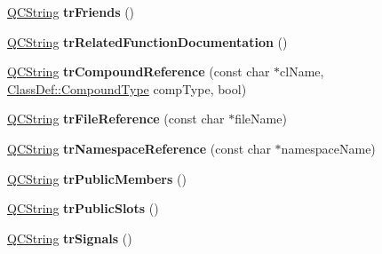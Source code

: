 \begin{DoxyCompactItemize}
\item 
\hypertarget{class_translator_croatian_a09300dedef1bc1ce5c2de5d70e6051bf}{\hyperlink{class_q_c_string}{Q\-C\-String} {\bfseries tr\-Friends} ()}\label{class_translator_croatian_a09300dedef1bc1ce5c2de5d70e6051bf}

\item 
\hypertarget{class_translator_croatian_ae97d87449f2ff86c736e70fdeb6c2534}{\hyperlink{class_q_c_string}{Q\-C\-String} {\bfseries tr\-Related\-Function\-Documentation} ()}\label{class_translator_croatian_ae97d87449f2ff86c736e70fdeb6c2534}

\item 
\hypertarget{class_translator_croatian_ad67d959a4f34a4e4038c62428001654c}{\hyperlink{class_q_c_string}{Q\-C\-String} {\bfseries tr\-Compound\-Reference} (const char $\ast$cl\-Name, \hyperlink{class_class_def_a768a6f0a6fd7e9087ff7971abbcc3f36}{Class\-Def\-::\-Compound\-Type} comp\-Type, bool)}\label{class_translator_croatian_ad67d959a4f34a4e4038c62428001654c}

\item 
\hypertarget{class_translator_croatian_ab665cdc5cebda16bb4acbdc62718a2ba}{\hyperlink{class_q_c_string}{Q\-C\-String} {\bfseries tr\-File\-Reference} (const char $\ast$file\-Name)}\label{class_translator_croatian_ab665cdc5cebda16bb4acbdc62718a2ba}

\item 
\hypertarget{class_translator_croatian_a8afd00694e0e220867c090eecfdd861a}{\hyperlink{class_q_c_string}{Q\-C\-String} {\bfseries tr\-Namespace\-Reference} (const char $\ast$namespace\-Name)}\label{class_translator_croatian_a8afd00694e0e220867c090eecfdd861a}

\item 
\hypertarget{class_translator_croatian_a21c92afb604c94e0636482e72081e182}{\hyperlink{class_q_c_string}{Q\-C\-String} {\bfseries tr\-Public\-Members} ()}\label{class_translator_croatian_a21c92afb604c94e0636482e72081e182}

\item 
\hypertarget{class_translator_croatian_a9ea325858f846bec828dadd21d58ec0f}{\hyperlink{class_q_c_string}{Q\-C\-String} {\bfseries tr\-Public\-Slots} ()}\label{class_translator_croatian_a9ea325858f846bec828dadd21d58ec0f}

\item 
\hypertarget{class_translator_croatian_a5b7fb21c5120618a98594bc60c956185}{\hyperlink{class_q_c_string}{Q\-C\-String} {\bfseries tr\-Signals} ()}\label{class_translator_croatian_a5b7fb21c5120618a98594bc60c956185}


\end{DoxyCompactItemize}
